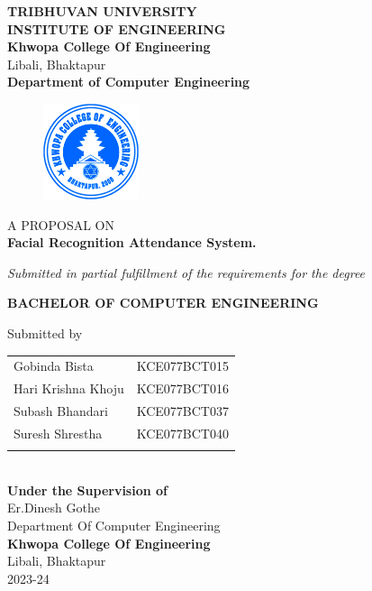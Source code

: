     \begin{center}
		\thispagestyle{empty}
		\Large\textbf{TRIBHUVAN UNIVERSITY}\\
		\Large\textbf{INSTITUTE OF ENGINEERING }\\
		\vspace{0.2in}
		\large{\textbf{Khwopa College Of Engineering}\\}
		\normalsize{Libali, Bhaktapur\\}
		\large\textbf{Department of Computer Engineering}
		\vspace{0.2in}
		\begin{figure}[h]
		    \centering
			    \includegraphics[width=0.25\textwidth]{Images/Khwopalogo.jpg}
		\end{figure}
		
		\vspace{0.2in}
		\large{A PROPOSAL ON\\\textbf{Facial Recognition Attendance System.}\\}
		
		\vspace{0.2in}
		\large{\textit{Submitted in partial fulfillment of the requirements for the degree\\}}
		
		\vspace{0.2in}
		\large{\textbf{BACHELOR OF COMPUTER ENGINEERING}\\}
		
		\vspace{0.2in}
		\large{Submitted by}\\
		\begin{tabular}{p{3.5in}p{3in}}
  \hspace{0.3cm}Gobinda Bista  & KCE077BCT015\\	
     \hspace{0.3cm}Hari Krishna Khoju & KCE077BCT016\\
     \hspace{0.3cm}Subash Bhandari & KCE077BCT037\\
      \hspace{0.3cm}Suresh Shrestha & KCE077BCT040\\


		 \vspace{0.2in}
		\end{tabular}
		\\
		\vspace{1cm}
		\large{\textbf{Under the Supervision of}\\}
			\normalsize{Er.Dinesh Gothe\\
				Department Of Computer Engineering\\
			}
			\vspace{2cm}
		\large{\textbf{Khwopa College Of Engineering}\\}
			\normalsize{Libali, Bhaktapur\\
			2023-24
		}
    \end{center}
